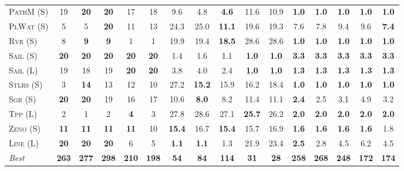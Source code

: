 \documentclass[11pt,landscape]{article}
\begin{document}
\begin{table*}[tb]
{\begin{tabular}{|l||ccccc||ccccc||ccccc||}
\textsc{PathM} (S)&19&\textbf{20}&\textbf{20}&17&18&9.6&4.8&\textbf{4.6}&11.6&10.9&\textbf{1.0}&\textbf{1.0}&\textbf{1.0}&\textbf{1.0}&\textbf{1.0}\\
\textsc{PlWat} (S)&5&5&\textbf{20}&11&13&24.3&25.0&\textbf{11.1}&19.6&19.3&7.6&7.8&9.4&9.6&\textbf{7.4}\\
\textsc{Rvr} (S)&8&\textbf{9}&\textbf{9}&1&1&19.9&19.4&\textbf{18.5}&28.6&28.6&\textbf{1.0}&\textbf{1.0}&\textbf{1.0}&\textbf{1.0}&\textbf{1.0}\\
\textsc{Sail} (S)&\textbf{20}&\textbf{20}&\textbf{20}&\textbf{20}&\textbf{20}&1.4&1.6&1.1&\textbf{1.0}&\textbf{1.0}&\textbf{3.3}&\textbf{3.3}&\textbf{3.3}&\textbf{3.3}&\textbf{3.3}\\
\textsc{Sail} (L)&19&18&19&\textbf{20}&\textbf{20}&3.8&4.0&2.4&\textbf{1.0}&\textbf{1.0}&\textbf{1.3}&\textbf{1.3}&\textbf{1.3}&\textbf{1.3}&\textbf{1.3}\\
\textsc{Stlrs} (S)&3&\textbf{14}&13&12&10&27.2&\textbf{15.2}&15.9&16.2&18.4&\textbf{1.0}&\textbf{1.0}&\textbf{1.0}&\textbf{1.0}&\textbf{1.0}\\
\textsc{Sgr} (S)&\textbf{20}&\textbf{20}&19&16&17&10.6&\textbf{8.0}&8.2&11.4&11.1&\textbf{2.4}&2.5&3.1&4.9&3.2\\
\textsc{Tpp} (L)&2&1&2&\textbf{4}&3&27.8&28.6&27.1&\textbf{25.7}&26.2&\textbf{2.0}&\textbf{2.0}&\textbf{2.0}&\textbf{2.0}&\textbf{2.0}\\
\textsc{Zeno} (S)&\textbf{11}&\textbf{11}&\textbf{11}&\textbf{11}&10&\textbf{15.4}&16.7&\textbf{15.4}&15.7&16.9&\textbf{1.6}&\textbf{1.6}&\textbf{1.6}&\textbf{1.6}&1.8\\
\textsc{Line} (L)&\textbf{20}&\textbf{20}&\textbf{20}&6&5&\textbf{1.1}&\textbf{1.1}&1.3&21.9&23.4&\textbf{2.5}&2.8&4.5&6.2&4.5
\\\hline
\textit{Best}&\textbf{263}&\textbf{277}&\textbf{298}&\textbf{210}&\textbf{198}&\textbf{54}&\textbf{84}&\textbf{114}&\textbf{31}&\textbf{28}&\textbf{258}&\textbf{268}&\textbf{248}&\textbf{172}&\textbf{174}\\\hline

        \end{tabular}}
        \caption{}
        \label{tab:all-patty}
        \end{table*}
        
\end{document}
